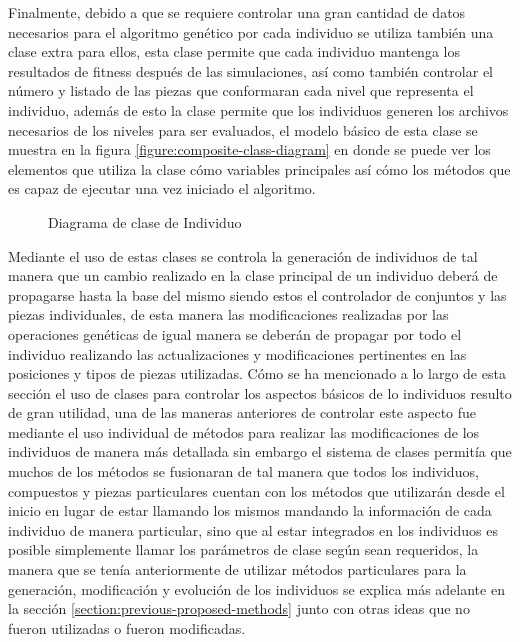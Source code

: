 Finalmente, debido a que se requiere controlar una gran cantidad de datos
necesarios para el algoritmo genético por cada individuo se utiliza también una
clase extra para ellos, esta clase permite que cada individuo mantenga los
resultados de fitness después de las simulaciones, así como también controlar el
número y listado de las piezas que conformaran cada nivel que representa el
individuo, además de esto la clase permite que los individuos generen los
archivos necesarios de los niveles para ser evaluados, el modelo básico de esta
clase se muestra en la figura \ref{figure:composite-class-diagram} en donde se
puede ver los elementos que utiliza la clase cómo variables principales así cómo
los métodos que es capaz de ejecutar una vez iniciado el algoritmo.

\begin{figure}
  \centering
  \scalebox{.65}{}
  \caption{Diagrama de clase de Individuo}
  \label{figure:individual-class-diagram}
\end{figure}

Mediante el uso de estas clases se controla la generación de individuos de tal
manera que un cambio realizado en la clase principal de un individuo deberá de
propagarse hasta la base del mismo siendo estos el controlador de conjuntos y
las piezas individuales, de esta manera las modificaciones realizadas por las
operaciones genéticas de igual manera se deberán de propagar por todo el
individuo realizando las actualizaciones y modificaciones pertinentes en las
posiciones y tipos de piezas utilizadas. Cómo se ha mencionado a lo largo de
esta sección el uso de clases para controlar los aspectos básicos de lo
individuos resulto de gran utilidad, una de las maneras anteriores de controlar
este aspecto fue mediante el uso individual de métodos para realizar las
modificaciones de los individuos de manera más detallada sin embargo el sistema
de clases permitía que muchos de los métodos se fusionaran de tal manera que
todos los individuos, compuestos y piezas particulares cuentan con los métodos
que utilizarán desde el inicio en lugar de estar llamando los mismos mandando la
información de cada individuo de manera particular, sino que al estar integrados
en los individuos es posible simplemente llamar los parámetros de clase según
sean requeridos, la manera que se tenía anteriormente de utilizar métodos
particulares para la generación, modificación y evolución de los individuos se
explica más adelante en la sección \ref{section:previous-proposed-methods} junto
con otras ideas que no fueron utilizadas o fueron modificadas.

